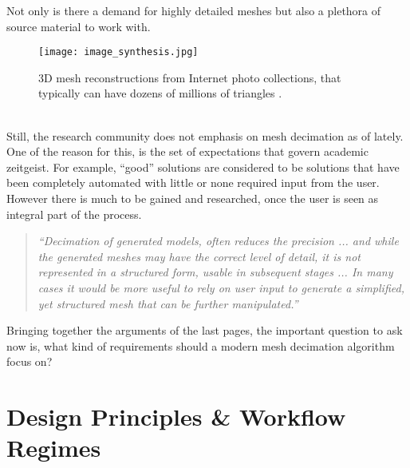Not only is there a demand for highly detailed meshes but also a plethora of source material to work with.
\begin{figure}[ht]
\centering
\texttt{[image: image\_synthesis.jpg]}
\caption{3D mesh reconstructions from Internet photo collections, that typically can have dozens of millions of triangles \citep[][p.6]{Snavely2008}.}
\label{fig:image_synthesis}
\end{figure}\\
Still, the research community does not emphasis on mesh decimation as of lately.
One of the reason for this, is the set of expectations that govern academic zeitgeist.
For example, ``good'' solutions are considered to be solutions that have been completely automated with little or none required input from the user.
However there is much to be gained and researched, once the user is seen as integral part of the process.
\begin{quote} \textit{``Decimation of generated models, often reduces the precision ... and while the generated meshes may have the correct level of detail, it is not represented in a structured form, usable in subsequent stages ... In many cases it would be more useful to rely on user input to generate a simplified, yet structured mesh that can be further manipulated.''} \citep[p.195]{Sylwan2011} \end{quote}
Bringing together the arguments of the last pages, the important question to ask now is, what kind of requirements should a modern mesh decimation algorithm focus on?

\section{Design Principles \& Workflow Regimes}
\label{introduction4}

